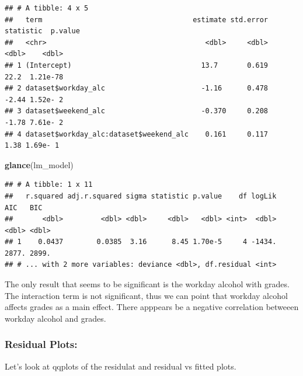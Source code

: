 \documentclass[]{article}
\newenvironment{Shaded}{\begin{snugshade}}{\end{snugshade}}
\newcommand{\KeywordTok}[1]{\textcolor[rgb]{0.13,0.29,0.53}{\textbf{#1}}}
\newcommand{\NormalTok}[1]{#1}
\begin{document}
\begin{verbatim}
## # A tibble: 4 x 5
##   term                                    estimate std.error statistic  p.value
##   <chr>                                      <dbl>     <dbl>     <dbl>    <dbl>
## 1 (Intercept)                               13.7       0.619     22.2  1.21e-78
## 2 dataset$workday_alc                       -1.16      0.478     -2.44 1.52e- 2
## 3 dataset$weekend_alc                       -0.370     0.208     -1.78 7.61e- 2
## 4 dataset$workday_alc:dataset$weekend_alc    0.161     0.117      1.38 1.69e- 1
\end{verbatim}

\begin{Shaded}
\begin{Highlighting}[]
\KeywordTok{glance}\NormalTok{(lm_model)}
\end{Highlighting}
\end{Shaded}

\begin{verbatim}
## # A tibble: 1 x 11
##   r.squared adj.r.squared sigma statistic p.value    df logLik   AIC   BIC
##       <dbl>         <dbl> <dbl>     <dbl>   <dbl> <int>  <dbl> <dbl> <dbl>
## 1    0.0437        0.0385  3.16      8.45 1.70e-5     4 -1434. 2877. 2899.
## # ... with 2 more variables: deviance <dbl>, df.residual <int>
\end{verbatim}

The only result that seems to be significant is the workday alcohol with
grades. The interaction term is not significant, thus we can point that
workday alcohol affects grades as a main effect. There apppears be a
negative correlation betweeen workday alcohol and grades.

\hypertarget{residual-plots}{%
\subsubsection{Residual Plots:}\label{residual-plots}}

Let's look at qqplots of the residulat and residual vs fitted plots.
\end{document}
